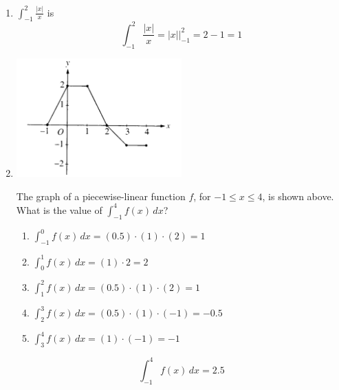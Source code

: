 \documentclass[12pt]{article}
\begin{document}
\begin{enumerate}
\item $\int^2_{-1} \frac{|x|}{x}$ is
$$ \int^2_{-1} \frac{|x|}{x} = |x| \biggr\rvert_{-1}^{2} = 2-1=\boxed{1}$$
\item 
\begin{center}
    \includegraphics[width=2.5in]{original-12.png}
\end{center}
The graph of a piecewise-linear function $f$, for $-1 \leq x \leq 4$, is shown above. What is the value of $\int_{-1}^{4} f(x) \, dx$?
\begin{enumerate}
    \item $\int_{-1}^{0} f(x) \, dx = (0.5) \cdot (1) \cdot (2) =1$
    \item $\int_{0}^{1} f(x) \, dx = (1) \cdot 2 =2$
    \item $\int_{1}^{2} f(x) \, dx = (0.5) \cdot (1) \cdot (2) =1$
    \item  $\int_{2}^{3} f(x) \, dx = (0.5) \cdot (1) \cdot (-1) =-0.5$
    \item $\int_{3}^{4} f(x) \, dx = (1) \cdot (-1) = -1$
\end{enumerate}
$$\boxed{\int_{-1}^{4} f(x) \, dx =2.5}$$
\end{enumerate}
\end{document}
